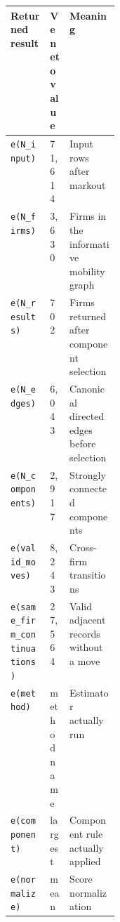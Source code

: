 \begin{tabularx}{\linewidth}{@{}lR{0.18\linewidth}X@{}}
\toprule
Returned result & Veneto value & Meaning \\
\midrule
\texttt{e(N\_input)} & 71,614 & Input rows after markout \\
\texttt{e(N\_firms)} & 3,630 & Firms in the informative mobility graph \\
\texttt{e(N\_results)} & 702 & Firms returned after component selection \\
\texttt{e(N\_edges)} & 6,043 & Canonical directed edges before selection \\
\texttt{e(N\_components)} & 2,917 & Strongly connected components \\
\texttt{e(valid\_moves)} & 8,243 & Cross-firm transitions \\
\texttt{e(same\_firm\_continuations)} & 27,564 & Valid adjacent records without a move \\
\texttt{e(method)} & method name & Estimator actually run \\
\texttt{e(component)} & largest & Component rule actually applied \\
\texttt{e(normalize)} & mean & Score normalization \\
\bottomrule
\end{tabularx}
